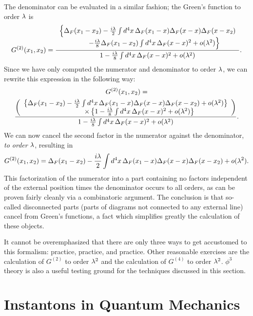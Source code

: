 \documentclass[12pt]{article}
\begin{document}
The denominator can be evaluated in a similar fashion; the Green's
function to order $\lambda$ is
\[
G^{(2)}(x_1,x_2)={
\begin{array}{c}
\Big\{\Delta_F(x_1-x_2)
-{i\lambda\over2}\int d^4x\,\Delta_F(x_1-x)\Delta_F(x-x)\Delta_F(x-x_2)\\
\qquad-{i\lambda\over8}\Delta_F(x_1-x_2)\int d^4x\,\Delta_F(x-x)^2
+o(\lambda^2)\Big\}
\end{array}
\over
1-{i\lambda\over8}\int d^4x\,\Delta_F(x-x)^2+o(\lambda^2)
}.
\]
Since we have only computed the numerator and denominator to order
$\lambda$, we can rewrite this expression in the following way:
\begin{multline*}
G^{(2)}(x_1,x_2)=\\
{
\left(\begin{array}{c}
\left\{\Delta_F(x_1-x_2)
-{i\lambda\over2}\int d^4x\,\Delta_F(x_1-x)\Delta_F(x-x)\Delta_F(x-x_2)
+o(\lambda^2)\right\}\\
\qquad\qquad
\times\left\{1-{i\lambda\over8}\int d^4x\,\Delta_F(x-x)^2+o(\lambda^2)\right\}
\end{array}\right)
\over
1-{i\lambda\over8}\int d^4x\,\Delta_F(x-x)^2+o(\lambda^2)
}.
\end{multline*}
We can now cancel the second factor in the numerator against
the denominator, {\em to order $\lambda$}, resulting in
\[
G^{(2)}(x_1,x_2)=\Delta_F(x_1-x_2)
-{i\lambda\over2}\int d^4x\,\Delta_F(x_1-x)\Delta_F(x-x)\Delta_F(x-x_2)
+o(\lambda^2).
\]
This factorization of the numerator into a part containing no factors
independent of the external position times the denominator occurs to
all orders, as can be proven fairly cleanly via a combinatoric
argument. The conclusion is that so-called disconnected parts (parts
of diagrams not connected to any external line) cancel
from Green's functions, a fact which simplifies greatly the
calculation of these objects.

It cannot be overemphasized
that there are only three ways to get accustomed to this formalism:
practice, practice,
and practice. Other reasonable exercises are the calculation of
$G^{(2)}$ to order $\lambda^2$ and the calculation of $G^{(4)}$ to order
$\lambda^2$. $\phi^3$ theory is also a useful testing ground for the
techniques discussed in this section.



\section[Instantons]
{Instantons in Quantum Mechanics}
\end{document}
